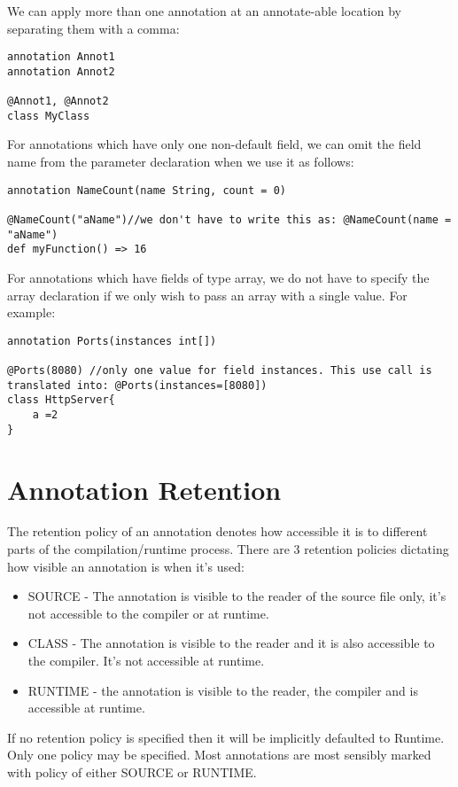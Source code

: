 \documentclass[conc-doc]{subfiles}
\begin{document}
We can apply more than one annotation at an annotate-able location by separating them with a comma:

\begin{lstlisting}
annotation Annot1
annotation Annot2

@Annot1, @Annot2
class MyClass
\end{lstlisting}


For annotations which have only one non-default field, we can omit the field name from the parameter declaration when we use it as follows:
\begin{lstlisting}
annotation NameCount(name String, count = 0)

@NameCount("aName")//we don't have to write this as: @NameCount(name = "aName")
def myFunction() => 16
\end{lstlisting}

For annotations which have fields of type array, we do not have to specify the array declaration if we only wish to pass an array with a single value. For example:
\begin{lstlisting}
annotation Ports(instances int[])

@Ports(8080) //only one value for field instances. This use call is translated into: @Ports(instances=[8080])
class HttpServer{
	a =2
}
\end{lstlisting}

\section{Annotation Retention}
The retention policy of an annotation denotes how accessible it is to different parts of the compilation/runtime process. There are 3 retention policies dictating how visible an annotation is when it's used:
\begin{itemize}
	\item SOURCE - The annotation is visible to the reader of the source file only, it's not accessible to the compiler or at runtime.
	\item CLASS - The annotation is visible to the reader and it is also accessible to the compiler. It's not accessible at runtime.
	\item RUNTIME - the annotation is visible to the reader, the compiler and is accessible at runtime.
\end{itemize}

If no retention policy is specified then it will be implicitly defaulted to Runtime. Only one policy may be specified. Most annotations are most sensibly marked with policy of either SOURCE or RUNTIME.
\end{document}
